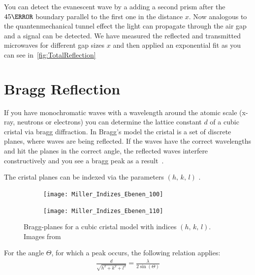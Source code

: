 \documentclass[a4paper,10pt,twocolumn]{article}
\begin{document}
    You can detect the evanescent wave by a adding a second prism after the $ 45\degree$ boundary parallel to the first one
    in the distance $x$.
    Now analogous to the quantenmechanical tunnel effect\cite{gerth} the light can propagate through the air gap and a signal can be
    detected.
    We have measured the reflected and transmitted microwaves for different gap sizes $x$ and then applied an exponential 
    fit as you can see in~\ref{fig:TotalReflection}


    \section{Bragg Reflection}
    If you have monochromatic waves with a wavelength around the atomic scale (x-ray, neutrons or electrons) you can
    determine the lattice constant $d$ of a cubic cristal via bragg diffraction. 
    In Bragg's model the cristal is a set of discrete planes, where waves are being reflected.
    If the waves have the correct wavelengths and hit the planes in the correct angle, the reflected waves interfere 
    constructively and you see a bragg peak as a result~\cite{gerth}.
    
    The cristal planes can be indexed via the parameters $(h,\,k,\,l)$ .
    \begin{figure}[htbp]
        \centering
        \begin{subfigure}{0.49\linewidth}
            \centering
            \texttt{[image: Miller\_Indizes\_Ebenen\_100]}
        \end{subfigure}
        \begin{subfigure}{0.49\linewidth}
            \centering
            \texttt{[image: Miller\_Indizes\_Ebenen\_110]}
        \end{subfigure}
        \caption{Bragg-planes for a cubic cristal model with indices $(h,\,k,\,l)$.
        Images from ~\cite{miller}}
        \label{fig:BraggPlanesIndices}
    \end{figure}
    For the angle $\Theta$, for which a peak occurs, the following relation applies:
    \begin{align}
        \label{eq:BraggAngle}
        \frac{d}{\sqrt{h^2+k^2+l^2}} = \frac{\lambda}{2 \sin(\Theta)}
    \end{align}
    
\end{document}
